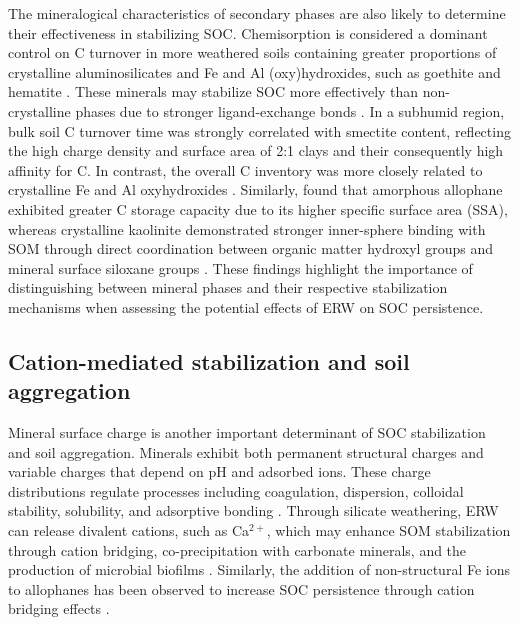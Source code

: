 \documentclass[preprint,12pt]{elsarticle}
\begin{document}
The mineralogical characteristics of secondary phases are also likely to determine their effectiveness in stabilizing SOC. Chemisorption is considered a dominant control on C turnover in more weathered soils containing greater proportions of crystalline aluminosilicates and Fe and Al (oxy)hydroxides, such as goethite and hematite \citep{khomo2017timescales}. These minerals may stabilize SOC more effectively than non-crystalline phases due to stronger ligand-exchange bonds \citep{sun2026tradeoff}. In a subhumid region, bulk soil C turnover time was strongly correlated with smectite content, reflecting the high charge density and surface area of 2:1 clays and their consequently high affinity for C. In contrast, the overall C inventory was more closely related to crystalline Fe and Al oxyhydroxides \citep{khomo2017timescales}. Similarly, \citep{sun2026tradeoff} found that amorphous allophane exhibited greater C storage capacity due to its higher specific surface area (SSA), whereas crystalline kaolinite demonstrated stronger inner-sphere binding with SOM through direct coordination between organic matter hydroxyl groups and mineral surface siloxane groups \citep{sun2026tradeoff}. These findings highlight the importance of distinguishing between mineral phases and their respective stabilization mechanisms when assessing the potential effects of ERW on SOC persistence.

\subsection{Cation-mediated stabilization and soil aggregation}

Mineral surface charge is another important determinant of SOC stabilization and soil aggregation. Minerals exhibit both permanent structural charges and variable charges that depend on pH and adsorbed ions. These charge distributions regulate processes including coagulation, dispersion, colloidal stability, solubility, and adsorptive bonding \citep{kleber2021dynamic}. Through silicate weathering, ERW can release divalent cations, such as Ca$^{2+}$, which may enhance SOM stabilization through cation bridging, co-precipitation with carbonate minerals, and the production of microbial biofilms \citep{sokol2024reduced,Rowley2018,Buss2024}. Similarly, the addition of non-structural Fe ions to allophanes has been observed to increase SOC persistence through cation bridging effects \citep{sun2026tradeoff}.
\end{document}
